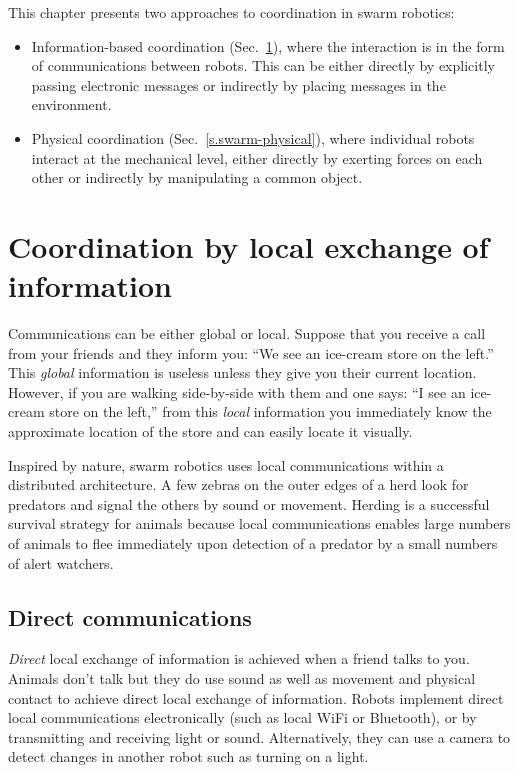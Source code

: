 This chapter presents two approaches to coordination in swarm robotics: \begin{itemize}
\item Information-based coordination (Sec.~\ref{s.swarm-info}), where the interaction is in the form of communications between robots. This can be either directly by explicitly passing electronic messages or indirectly by placing messages in the environment.
\item Physical coordination (Sec.~\ref{s.swarm-physical}), where individual robots interact at the mechanical level, either directly by exerting forces on each other or indirectly by manipulating a common object.
\end{itemize}

\section{Coordination by local exchange of information}\label{s.swarm-info}

Communications can be either global or local. Suppose that you receive a call from your friends and they inform you: ``We see an ice-cream store on the left.'' This \emph{global} information is useless unless they give you their current location. However, if you are walking side-by-side with them and one says: ``I see an ice-cream store on the left,'' from this \emph{local} information you immediately know the approximate location of the store and can easily locate it visually.

Inspired by nature, swarm robotics uses local communications within a distributed architecture. A few zebras on the outer edges of a herd look for predators and signal the others by sound or movement. Herding is a successful survival strategy for animals because local communications enables large numbers of animals to flee immediately upon detection of a predator by a small numbers of alert watchers.

\subsection{Direct communications}

\emph{Direct} local exchange of information is achieved when a friend talks to you. Animals don't talk but they do use sound as well as movement and physical contact to achieve direct local exchange of information. Robots implement direct local communications electronically (such as local WiFi or Bluetooth), or by transmitting and receiving light or sound. Alternatively, they can use a camera to detect changes in another robot such as turning on a light. 

